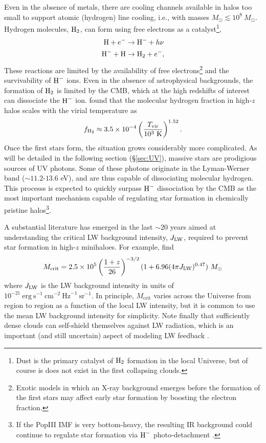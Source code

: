 Even in the absence of metals, there are cooling channels available in halos too small to support atomic (hydrogen) line cooling, i.e., with masses $M_{\odot} \lesssim 10^8 \ M_{\odot}$. Hydrogen molecules, $\text{H}_2$, can form using free electrons as a catalyst\footnote{Dust is the primary catalyst of $\text{H}_2$ formation in the local Universe, but of course is does not exist in the first collapsing clouds.}, 
\begin{align}
	\text{H} + e^- & \rightarrow \text{H}^- + h\nu \\
	\text{H}^- + \text{H} & \rightarrow \text{H}_2 + e^- ,
\end{align}
These reactions are limited by the availability of free electrons\footnote{
Exotic models in which an X-ray background emerges before the formation of the first stars may affect early star formation by boosting the electron fraction.} and the survivability of $\text{H}^{-}$ ions. Even in the absence of astrophysical backgrounds, the formation of $\text{H}_2$ is limited by the CMB, which at the high redshifts of interest can dissociate the $\text{H}^{-}$ ion. \cite{Tegmark1997} found that the molecular hydrogen fraction in high-$z$ halos scales with the virial temperature as
\begin{equation}
	f_{\text{H}_2} \approx 3.5 \times 10^{-4} \left(\frac{T_{\text{vir}}}{10^3 \ \mathrm{K}} \right)^{1.52} .
\end{equation}
Once the first stars form, the situation grows considerably more complicated. As will be detailed in the following section (\S\ref{sec:UV}), massive stars are prodigious sources of UV photons. Some of these photons originate in the Lyman-Werner band ($\sim 11.2$-$13.6$ eV), and are thus capable of dissociating molecular hydrogen. This processs is expected to quickly surpass $\text{H}^{-}$ dissociation by the CMB as the most important mechanism capable of regulating star formation in chemically pristine halos\footnote{If the PopIII IMF is very bottom-heavy, the resulting IR background  could continue to regulate star formation via $\text{H}^{-}$ photo-detachment \cite{WolcottGreen2012}.}. 

A substantial literature has emerged in the last $\sim 20$ years aimed at understanding the critical LW background intensity, $J_{\text{LW}}$, required to prevent star formation in high-$z$ minihaloes. For example, \cite{Visbal2014} find
\begin{equation}
	M_{\mathrm{crit}} = 2.5 \times 10^5 \left(\frac{1+z}{26} \right)^{-3/2} (1 + 6.96(4\pi \JLW)^{0.47})  \ \Msun
\end{equation}
where $J_{\text{LW}}$ is the LW background intensity in units of $10^{-21} \ \mathrm{erg} \ \mathrm{s}^{-1} \ \mathrm{cm}^{-2} \ \mathrm{Hz}^{-1} \ \mathrm{sr}^{-1}$. In principle, $M_{\mathrm{crit}}$ varies across the Universe from region to region as a function of the local LW intensity, but it is common to use the mean LW background intensity for simplicity. Note finally that sufficiently dense clouds can self-shield themselves against LW radiation, which is an important (and still uncertain) aspect of modeling LW feedback \cite{WolcottGreen2011}.


